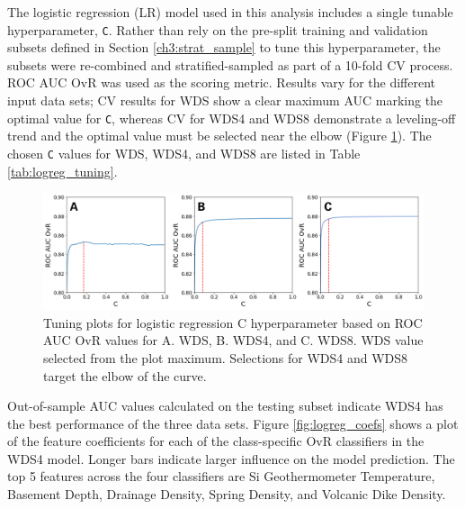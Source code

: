The logistic regression (LR) model used in this analysis \citep{pedregosa_scikit-learn_2011} includes a single tunable hyperparameter, \verb|C|. Rather than rely on the pre-split training and validation subsets defined in Section \ref{ch3:strat_sample} to tune this hyperparameter, the subsets were re-combined and stratified-sampled as part of a 10-fold CV process. ROC AUC OvR was used as the scoring metric. Results vary for the different input data sets; CV results for WDS show a clear maximum AUC marking the optimal value for \verb|C|, whereas CV for WDS4 and WDS8 demonstrate a leveling-off trend and the optimal value must be selected near the elbow (Figure \ref{fig:logreg_hp_tuning}). The chosen \verb|C| values for WDS, WDS4, and WDS8 are listed in Table \ref{tab:logreg_tuning}.

\begin{figure}%
\centering
\includegraphics[width=\textwidth]{templates/images/Figure-LR_C_tuning.png}
\singlespacing
\caption[Logistic regression hyperparameter tuning]{Tuning plots for logistic regression C hyperparameter based on ROC AUC OvR values for A. WDS,  B. WDS4, and C. WDS8. WDS value selected from the plot maximum. Selections for WDS4 and WDS8 target the elbow of the curve.}
\label{fig:logreg_hp_tuning}
\end{figure}

Out-of-sample AUC values calculated on the testing subset indicate WDS4 has the best performance of the three data sets. Figure \ref{fig:logreg_coefs} shows a plot of the feature coefficients for each of the class-specific OvR classifiers in the WDS4 model. Longer bars indicate larger influence on the model prediction. The top 5 features across the four classifiers are Si Geothermometer Temperature, Basement Depth, Drainage Density, Spring Density, and Volcanic Dike Density.

